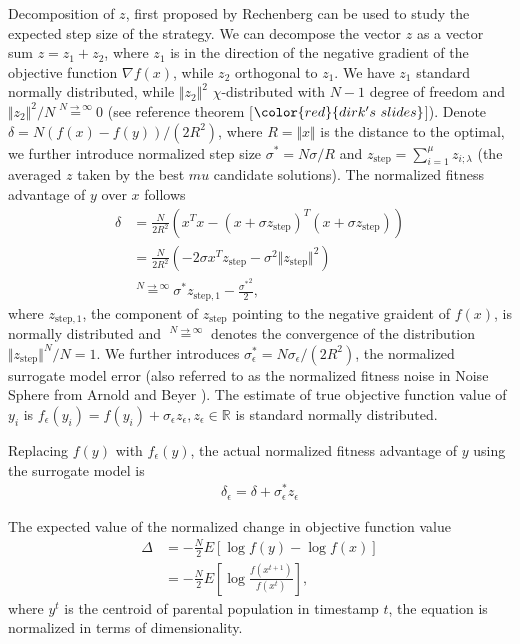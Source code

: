 Decomposition of $z$, first proposed by Rechenberg \cite{rechenberg1973evolutionsstrategie} can be used to study the expected step size of the strategy. We can decompose the vector $z$ as a vector sum $z = z_1 + z_2$, where $z_1$ is in the direction of the negative gradient of the objective function $\nabla f(x)$, while $z_2$ orthogonal to $z_1$. We have $z_1$ standard normally distributed, while $\Vert z_2\Vert^2$ $\chi$-distributed with $N-1$ degree of freedom and $ \Vert z_2\Vert^2 /N \overset{N \rightarrow \infty }{=} 0$ (see reference theorem [$\color{red}{dirk's\ slides }$]). Denote $\delta = N (f(x) - f(y))/(2R^2)$, where $R = \Vert x \Vert$ is the distance to the optimal, we further introduce normalized step size $\sigma^* = N \sigma/R$ and $z_{\text{step}} = \sum_{i=1}^\mu z_{i;\lambda}$ (the averaged $z$ taken by the best $mu$ candidate solutions). The normalized fitness advantage of $y$ over $x$ follows
\begin{align}
\delta & = \frac{N}{2R^2} (x^Tx - (x+\sigma z_{\text{step}})^T (x+\sigma z_{\text{step}})) \nonumber\\
& = \frac{N}{2R^2} (-2 \sigma x^Tz_{\text{step}} - \sigma^2 \Vert z_{\text{step}}\Vert^2 ) \nonumber\\
& \overset{N \rightarrow \infty}{=} \sigma^* z_{\text{step},1} - \frac{{\sigma^*} ^2}{2},
\end{align}
where $z_{\text{step},1} $, the component of $z_{\text{step}}$ pointing to the negative graident of $f(x)$, is normally distributed and $\overset{ N \rightarrow \infty}{=}$ denotes the convergence of the distribution $\Vert z_{\text{step} } \Vert^N/N = 1$. We further introduces $\sigma_\epsilon^* = N \sigma_\epsilon / (2R^2)$, the normalized surrogate model error (also referred to as the normalized fitness noise in Noise Sphere from Arnold and Beyer \cite{1284729}). The estimate of true objective function value of $y_i$ is $f_\epsilon (y_i) = f(y_i) + \sigma_\epsilon z_\epsilon, z_\epsilon \in \mathbb{R}$ is standard normally distributed.

Replacing $f(y)$ with $f_{\epsilon}(y)$, the actual normalized fitness advantage of $y$ using the surrogate model is 
\begin{align}
\delta_\epsilon = \delta+\sigma_\epsilon^* z_\epsilon 
\end{align}

The expected value of the normalized change in objective function value  
\begin{align}
\Delta &= -\frac{N}{2} E \left [  \log f(y) - \log {f(x)} \right ] \nonumber\\
 &= -\frac{N}{2} E \left [  \log \frac{f(x^{t+1})}{f(x^{t})} \right ], 
\end{align}
where $y^{t}$ is the centroid of parental population in timestamp $t$, the equation is normalized in terms of dimensionality.

